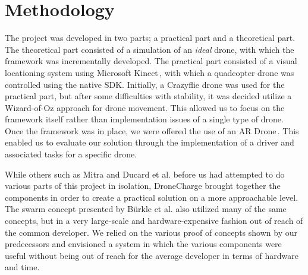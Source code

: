 \section{Methodology}
The project was developed in two parts; a practical part and a theoretical part. The theoretical part consisted of a simulation of an \textit{ideal} drone, with which the framework was incrementally developed. The practical part consisted of a visual locationing system using Microsoft Kinect\,\cite{kinect}, with which a quadcopter drone was controlled using the native SDK. Initially, a Crazyflie drone was used for the practical part, but after some difficulties with stability, it was decided utilize a Wizard-of-Oz approach for drone movement. This allowed us to focus on the framework itself rather than implementation issues of a single type of drone. Once the framework was in place, we were offered the use of an AR Drone\,\cite{ardrone}. This enabled us to evaluate our solution through the implementation of  a driver and associated tasks for a specific drone.

While others such as Mitra and Ducard et al. before us had attempted to do various parts of this project in isolation, DroneCharge brought together the components in order to create a practical solution on a more approachable level. The swarm concept presented by B\"urkle et al. also utilized many of the same concepts, but in a very large-scale and hardware-expensive fashion out of reach of the common developer. We relied on the various proof of concepts shown by our predecessors and envisioned a system in which the various components were useful without being out of reach for the average developer in terms of hardware and time.